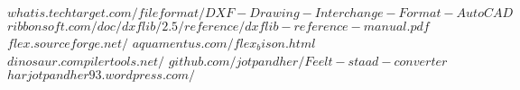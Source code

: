 \begin{thebibliography}{9}
 $whatis.techtarget.com/fileformat/DXF-Drawing-Interchange-Format-AutoCAD$
 $ribbonsoft.com/doc/dxflib/2.5/reference/dxflib-reference-manual.pdf$
 $flex.sourceforge.net/$
 $aquamentus.com/flex_bison.html$
 $dinosaur.compilertools.net/$
 $github.com/jotpandher/Feelt-staad-converter$
 $harjotpandher93.wordpress.com/$
\end{thebibliography}
